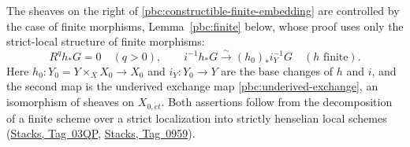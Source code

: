 \documentclass[11pt,a4paper]{article}
\numberwithin{equation}{section}
\theoremstyle{definition}
\theoremstyle{remark}
\newcommand{\et}{\acute{e}t}
\newcommand{\stacks}[1]{\href{https://stacks.math.columbia.edu/tag/#1}{\textnormal{Stacks, Tag~#1}}}
\begin{document}
The sheaves on the right of \eqref{pbc:constructible-finite-embedding}
are controlled by the case of finite morphisms, Lemma~\ref{pbc:finite}
below, whose proof uses only the strict-local structure of finite
morphisms:
\begin{equation}
 R^qh_*G=0\quad(q>0),\qquad
 i^{-1}h_*G\xrightarrow{\sim}(h_0)_*i_Y^{-1}G
 \quad(h\text{ finite}).
 \label{pbc:finite-direct-image-used}
\end{equation}
Here $h_0\colon Y_0=Y\times_XX_0\to X_0$ and $i_Y\colon Y_0\to Y$ are
the base changes of $h$ and $i$, and the second map is the underived
exchange map \eqref{pbc:underived-exchange}, an isomorphism of sheaves on
$X_{0,\et}$. Both assertions follow from the decomposition of a finite
scheme over a strict localization into strictly henselian local schemes
(\stacks{03QP}, \stacks{0959}).
\end{document}
